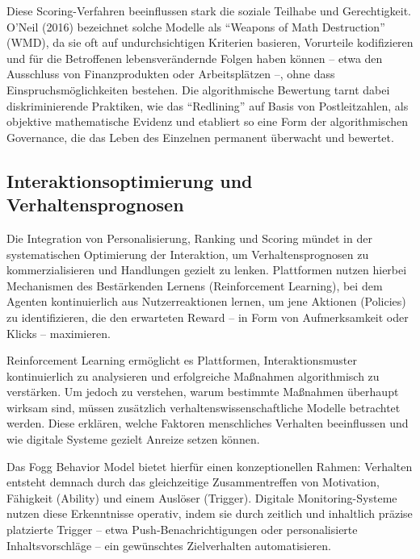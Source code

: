 Diese Scoring-Verfahren beeinflussen stark die soziale Teilhabe und Gerechtigkeit. O'Neil (2016) bezeichnet solche Modelle als \enquote{Weapons of Math Destruction} (WMD), da sie oft auf undurchsichtigen Kriterien basieren, Vorurteile kodifizieren und für die Betroffenen lebensverändernde Folgen haben können -- etwa den Ausschluss von Finanzprodukten oder Arbeitsplätzen --, ohne dass Einspruchsmöglichkeiten bestehen. Die algorithmische Bewertung tarnt dabei diskriminierende Praktiken, wie das \enquote{Redlining} auf Basis von Postleitzahlen, als objektive mathematische Evidenz und etabliert so eine Form der algorithmischen Governance, die das Leben des Einzelnen permanent überwacht und bewertet.

\subsection{Interaktionsoptimierung und Verhaltensprognosen}

Die Integration von Personalisierung, Ranking und Scoring mündet in der systematischen Optimierung der Interaktion, um Verhaltensprognosen zu kommerzialisieren und Handlungen gezielt zu lenken. Plattformen nutzen hierbei Mechanismen des Bestärkenden Lernens (Reinforcement Learning), bei dem Agenten kontinuierlich aus Nutzerreaktionen lernen, um jene Aktionen (Policies) zu identifizieren, die den erwarteten Reward -- in Form von Aufmerksamkeit oder Klicks -- maximieren.

Reinforcement Learning ermöglicht es Plattformen, Interaktionsmuster kontinuierlich zu analysieren und erfolgreiche Maßnahmen algorithmisch zu verstärken. Um jedoch zu verstehen, warum bestimmte Maßnahmen überhaupt wirksam sind, müssen zusätzlich verhaltenswissenschaftliche Modelle betrachtet werden. Diese erklären, welche Faktoren menschliches Verhalten beeinflussen und wie digitale Systeme gezielt Anreize setzen können.

Das Fogg Behavior Model bietet hierfür einen konzeptionellen Rahmen: Verhalten entsteht demnach durch das gleichzeitige Zusammentreffen von Motivation, Fähigkeit (Ability) und einem Auslöser (Trigger). Digitale Monitoring-Systeme nutzen diese Erkenntnisse operativ, indem sie durch zeitlich und inhaltlich präzise platzierte Trigger -- etwa Push-Benachrichtigungen oder personalisierte Inhaltsvorschläge -- ein gewünschtes Zielverhalten automatisieren.

